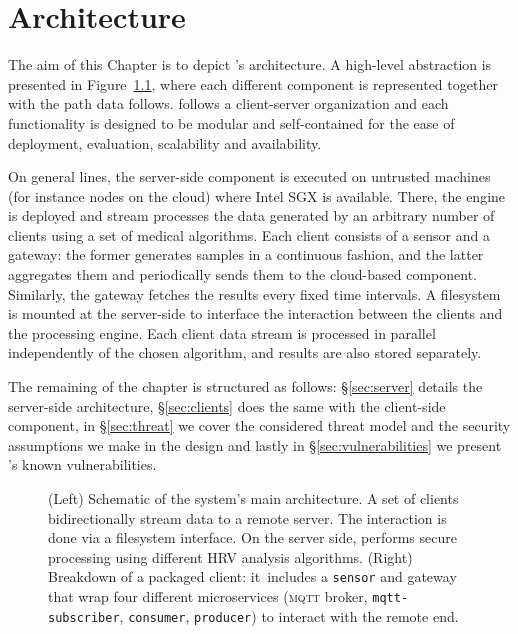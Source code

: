 \chapter{Architecture} \label{chap:architecture}

The aim of this Chapter is to depict \projName's architecture.
A high-level abstraction is presented in Figure~\ref{fig:system-architecture}, where each different component is represented together with the path data follows.
\projName follows a client-server organization and each functionality is designed to be modular and self-contained for the ease of deployment, evaluation, scalability and availability.

On general lines, the server-side component is executed on untrusted machines (for instance nodes on the cloud) where Intel SGX is available.
There, the \sgxspark engine is deployed and stream processes the data generated by an arbitrary number of clients using a set of medical algorithms.
Each client consists of a sensor and a gateway: the former generates samples in a continuous fashion, and the latter aggregates them and periodically sends them to the cloud-based component.
Similarly, the gateway fetches the results every fixed time intervals.
A filesystem is mounted at the server-side to interface the interaction between the clients and the processing engine.
Each client data stream is processed in parallel independently of the chosen algorithm, and results are also stored separately.

The remaining of the chapter is structured as follows: \S\ref{sec:server} details the server-side architecture, \S\ref{sec:clients} does the same with the client-side component, in \S\ref{sec:threat} we cover the considered threat model and the security assumptions we make in the design and lastly in \S\ref{sec:vulnerabilities} we present \projName's known vulnerabilities.

\begin{figure}[h!]
    \centering
    
    \caption[Schematic of the system's main architecture.]{(Left) Schematic of the system's main architecture. A set of clients bidirectionally stream data to a remote server. The interaction is done via a filesystem interface. On the server side, \sgxspark performs secure processing using different HRV analysis algorithms. (Right) Breakdown of a packaged client: it includes a \texttt{sensor} and gateway that wrap four different microservices (\textsc{mqtt} broker, \texttt{mqtt-subscriber}, \texttt{consumer}, \texttt{producer}) to interact with the remote end. \label{fig:system-architecture}}
\end{figure}


